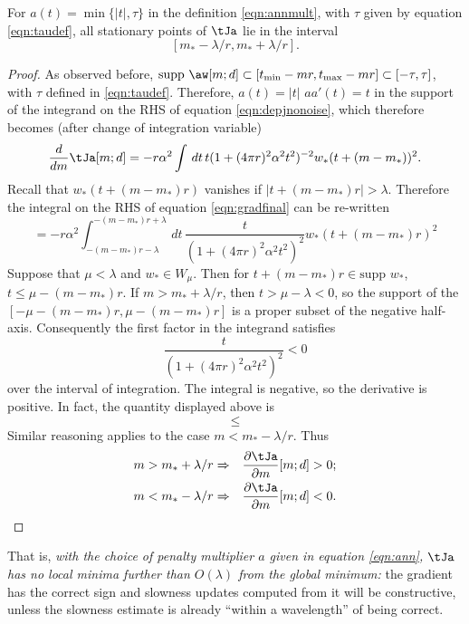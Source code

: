 \begin{theorem}
  \label{thm:rampgood}
  For $a(t)=\min\{|t|,\tau\}$ in the definition \ref{eqn:annmult},
  with $\tau$ given by equation \ref{eqn:taudef}, all
  stationary points of $\tJa$ lie in the interval
  \[
    [m_*-\lambda/r, m_*+\lambda/r].
  \]
\end{theorem}
\begin{proof}
  As observed before, $\mbox{supp }\aw[m;d] \subset [t_{\rm
    min}-mr,t_{\rm max}-mr]\subset [-\tau,\tau]$, with $\tau$ defined
  in \ref{eqn:taudef}. Therefore, $a(t) = |t|$ $a a'(t) = t$ in the
  support of the integrand on the RHS of equation
  \ref{eqn:depjnonoise}, which therefore 
  becomes (after change of integration variable)
  \begin{equation}
    \label{eqn:gradfinal}
    \frac{d}{dm}\tJa[m;d] = -r \alpha^2 \int \,dt \, 
  t(1+(4\pi r)^2 \alpha^2 
  t^2)^{-2}w_*(t+(m-m_*))^2.
  \end{equation}
  Recall that $w_*(t+(m-m_*)r)$
  vanishes if $|t+(m-m_*)r| > \lambda$. Therefore the integral on the
  RHS of equation \ref{eqn:gradfinal} can be re-written
  \[
    = -r\alpha^2\int_{-(m-m_*)r-\lambda}^{-(m-m_*)r+\lambda}
    \,dt\, \frac{t}{(1+(4\pi r)^2\alpha^2 t^2)^2}w_*\left(t+(m-m_*)r\right)^2
  \]
  Suppose that $\mu < \lambda$ and $w_* \in W_{\mu}$. Then for
  $t+(m-m_*)r \in \mbox{supp }w_*$, $t\le\mu-(m-m_*)r$.
  If $m > m_*+\lambda/r$, then $t >\mu-\lambda<0$, so the support of
  the $[-\mu-(m-m_*)r, \mu-(m-m_*)r]$ is a proper
  subset of the negative half-axis. Consequently the first factor in the
  integrand satisfies
  \[
    \frac{t}{(1+(4\pi r)^2\alpha^2 t^2)^2}< 0
  \]
  over the interval of integration. The integral is
  negative, so the derivative
  is positive. In fact, the quantity displayed above is
  \[
    \le 
  \]
  Similar reasoning applies to the case $m <
  m_*-\lambda/r$. Thus
  \begin{eqnarray}
    m > m_*+\lambda/r & \Rightarrow & \frac{\partial \tJa}{\partial
                                      m}[m;d]> 0; \nonumber\\
    m < m_*-\lambda/r & \Rightarrow & \frac{\partial \tJa}{\partial
                                      m}[m;d]< 0.
                                      \label{eqn:leftright}
  \end{eqnarray}
\end{proof}

 That is, {\em with the choice of penalty
  multiplier $a$ given in equation \ref{eqn:ann}, $\tJa$ has no local minima
  further than  $O(\lambda)$ from the global minimum:} the gradient
has the correct sign and slowness updates computed from it will be
constructive, unless the slowness estimate is already ``within a
wavelength'' of being correct.


